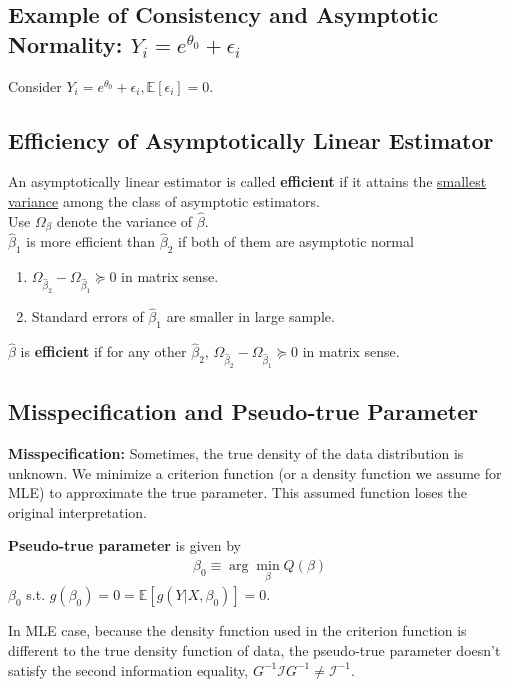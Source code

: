 \documentclass[11pt]{elegantbook}
\begin{document}
\subsection{Example of Consistency and Asymptotic Normality: $Y_i=e^{\theta_0}+\epsilon_i$}
Consider $Y_i=e^{\theta_0}+\epsilon_i, \mathbb{E}[\epsilon_i]=0$.


\subsection{Efficiency of Asymptotically Linear Estimator}
\begin{definition}
    \normalfont
    An asymptotically linear estimator is called \textbf{efficient} if it attains the \underline{smallest variance} among the class of asymptotic estimators.\\
    Use $\Omega_{\beta}$ denote the variance of $\hat{\beta}$.\\
    $\hat{\beta}_1$ is more efficient than $\hat{\beta}_2$ if both of them are asymptotic normal
    \begin{enumerate}[$\cdot$]
        \item $\Omega_{\hat{\beta}_2}-\Omega_{\hat{\beta}_1}\succeq 0$ in matrix sense.
        \item Standard errors of $\hat{\beta}_1$ are smaller in large sample.
    \end{enumerate}
    $\hat{\beta}$ is \textbf{efficient} if for any other $\hat{\beta}_2$, $\Omega_{\hat{\beta}_2}-\Omega_{\hat{\beta}_1}\succeq 0$ in matrix sense.
\end{definition}


\subsection{Misspecification and Pseudo-true Parameter}
\textbf{Misspecification:} Sometimes, the true density of the data distribution is unknown. We minimize a criterion function (or a density function we assume for MLE) to approximate the true parameter. This assumed function loses the original interpretation.
\begin{definition}
\normalfont
    \textbf{Pseudo-true parameter} is given by
    \begin{equation}
        \begin{aligned}
            \beta_0\equiv \arg\min_\beta Q(\beta)
        \end{aligned}
        \nonumber
    \end{equation}
    $\beta_0$ s.t. $g(\beta_0)=0=\mathbb{E}[g(Y|X,\beta_0)]=0$.
\end{definition}
In MLE case, because the density function used in the criterion function is different to the true density function of data, the pseudo-true parameter doesn't satisfy the second information equality, $G^{-1}\mathcal{I}G^{-1}\neq \mathcal{I}^{-1}$.
\end{document}
